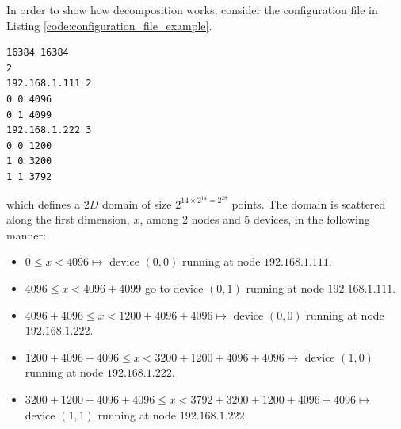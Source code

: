  In order to show how decomposition works, consider the configuration file in Listing \ref{code:configuration_file_example}.
 \begin{minipage}{\linewidth}
\begin{lstlisting}
16384 16384
2
192.168.1.111 2  
0 0 4096
0 1 4099
192.168.1.222 3
0 0 1200
1 0 3200
1 1 3792
\end{lstlisting}
\end{minipage}
which defines a $2D$ domain of size $2^{{14} \times 2^{{14}} = 2^{28}}$ points.
The domain is scattered along the first dimension, $x$, among 2 nodes and 5 devices, in the following manner:
\begin{itemize}
    \item $0 \leq x < 4096 \longmapsto$  device $(0,0)$ running at node $192.168.1.111$.
    \item  $4096 \leq x < 4096+4099$ go to device $(0,1)$ running at node $192.168.1.111$.
    
    \item  $4096+4096\leq x < 1200+4096+4096 \longmapsto$  device $(0,0)$ running at node $192.168.1.222$.
    \item  $1200+4096+4096\leq x < 3200+1200+4096+4096 \longmapsto$  device $(1,0)$ running at node $192.168.1.222$.
    \item  $3200+1200+4096+4096\leq x < 3792+3200+1200+4096+4096 \longmapsto$  device $(1,1)$ running at node $192.168.1.222$.
\end{itemize}



